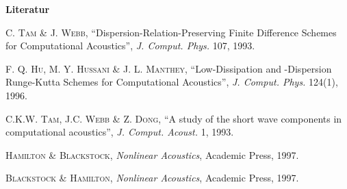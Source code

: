 
\vspace*{1cm}
      \begin{center} \textbf{\Large Literatur} \end{center}
\vspace*{-4.5cm}

\renewcommand{\baselinestretch}{1.05}\small\normalsize
\begin{thebibliography}{9}
 \textsc{C. Tam \& J. Webb,} ``Dispersion-Relation-Preserving Finite Difference Schemes for Computational Acoustics'', \textsl{J. Comput. Phys.} 107, 1993.

 \textsc{F. Q. Hu, M. Y. Hussani \& J. L. Manthey,}  ``Low-Dissipation and -Dispersion Runge-Kutta Schemes for Computational Acoustics'',  \textsl{J. Comput. Phys.} 124(1), 1996.

 \textsc{C.K.W. Tam, J.C. Webb \& Z. Dong,} ``A study of the short wave components in computational acoustics'', \textsl{J. Comput. Acoust.} 1, 1993. 

 \textsc{Hamilton \& Blackstock}, \textit{Nonlinear Acoustics}, Academic Press, 1997.

 \textsc{Blackstock \& Hamilton}, \textit{Nonlinear Acoustics}, Academic Press, 1997.
\end{thebibliography}
